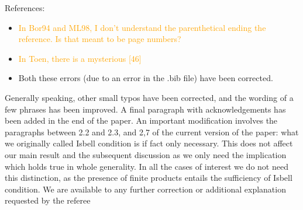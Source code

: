 \documentclass{amsart}
\begin{document}
References:
\begin{itemize}
\item \textcolor{orange}{In Bor94 and ML98, I don't understand the parenthetical ending the reference. Is that meant to be page numbers?}
\item \textcolor{orange}{In Toen, there is a mysterious [46]}
\item Both these errors (due to an error in the .bib file) have been corrected.
\end{itemize}
Generally speaking, other small typos have been corrected, and the wording of a few phrases has been improved. A final paragraph with acknowledgements has been added in the end of the paper.
An important modification involves the paragraphs between 2.2 and 2.3, and 2,7 of the current version of the paper: what we originally called Isbell condition is if fact only necessary. This does not affect our main result and the subsequent discussion as we only need the implication which holds true in whole generality. In all the cases of interest we do not need this distinction, as the presence of finite products entails the sufficiency of Isbell condition. We are available to any further correction or additional explanation requested by the referee 
\end{document}
